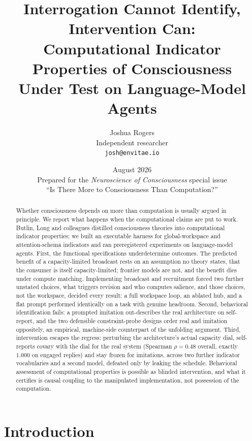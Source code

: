 \documentclass[11pt]{article}
\title{\textbf{Interrogation Cannot Identify, Intervention Can:\\
Computational Indicator Properties of Consciousness\\
Under Test on Language-Model Agents}}
\author{Joshua Rogers\\ \small Independent researcher \\ \small \texttt{josh@envitae.io}}
\date{August 2026 \\ \small Prepared for the \emph{Neuroscience of Consciousness} special issue\\ \small ``Is There More to Consciousness Than Computation?''}
\begin{document}
\maketitle

\begin{abstract}
\noindent Whether consciousness depends on more than computation is usually argued in
principle. We report what happens when the computational claims are put to work.
Butlin, Long and colleagues distilled consciousness theories into computational
indicator properties; we built an executable harness for global-workspace and
attention-schema indicators and ran preregistered experiments on language-model
agents. First, the functional specifications underdetermine outcomes. The predicted
benefit of a capacity-limited broadcast rests on an assumption no theory states,
that the consumer is itself capacity-limited; frontier models are not, and the
benefit dies under compute matching. Implementing broadcast and recruitment forced
two further unstated choices, what triggers revision and who computes salience, and
those choices, not the workspace, decided every result: a full workspace loop, an
ablated hub, and a flat prompt performed identically on a task with genuine
headroom. Second, behavioral identification fails: a prompted imitation
out-describes the real architecture on self-report, and the two defensible
constraint-probe designs order real and imitation oppositely, an empirical,
machine-side counterpart of the unfolding argument. Third, intervention escapes the
regress: perturbing the architecture's actual capacity dial, self-reports covary
with the dial for the real system (Spearman $\rho=0.48$ overall, exactly $1.000$ on
engaged replies) and stay frozen for imitations, across two further indicator
vocabularies and a second model, defeated only by leaking the schedule. Behavioral
assessment of computational properties is possible as blinded intervention, and
what it certifies is causal coupling to the manipulated implementation, not
possession of the computation.
\end{abstract}

\section{Introduction}
\end{document}
